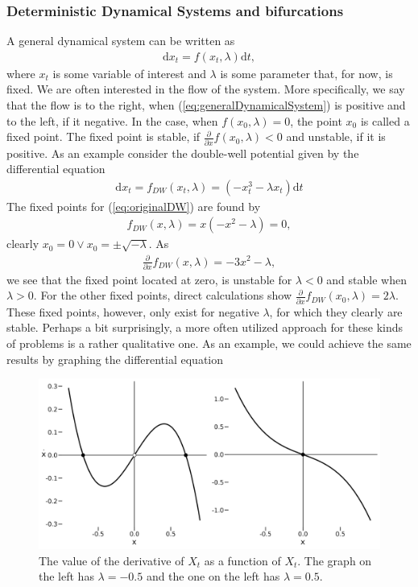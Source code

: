 \subsubsection{Deterministic Dynamical Systems and bifurcations}
A general dynamical system can be written as
\begin{align}
    \mathrm{d}x_t = f(x_t, \lambda)\mathrm{d}t, \label{eq:generalDynamicalSystem}
\end{align}
where $x_t$ is some variable of interest and $\lambda$ is some parameter that, for now, is fixed. We are often interested in the flow of the system. More specifically, we say that the flow is to the right, when (\ref{eq:generalDynamicalSystem}) is positive and to the left, if it negative. In the case, when $f(x_0, \lambda) = 0$, the point $x_0$ is called a fixed point. The fixed point is stable, if $\frac{\partial}{\partial x}f(x_0, \lambda) < 0$ and unstable, if it is positive. As an example consider the double-well potential given by the differential equation 
\begin{align}
    \mathrm{d}x_t = f_{DW}(x_t, \lambda) = \left(-x_t^3 - \lambda x_t\right) \mathrm{d}t \label{eq:originalDW}
\end{align}
The fixed points for (\ref{eq:originalDW}) are found by 
\begin{align}
    f_{DW}(x, \lambda) = x\left(-x^2 - \lambda\right) = 0,
\end{align}
clearly $x_0 = 0 \lor x_0 = \pm \sqrt{-\lambda}$. As 
\begin{align}
    \frac{\partial}{\partial x}f_{DW}(x, \lambda) = -3x^2 - \lambda,
\end{align}
we see that the fixed point located at zero, is unstable for $\lambda<0$ and stable when $\lambda>0$. For the other fixed points, direct calculations show $\frac{\partial}{\partial x}f_{DW}(x_0, \lambda) = 2\lambda$. These fixed points, however, only exist for negative $\lambda$, for which they clearly are stable. 
Perhaps a bit surprisingly, a more often utilized approach for these kinds of problems is a rather qualitative one. As an example, we could achieve the same results by graphing the differential equation
\begin{figure}[h]
    \begin{center}
        \includegraphics[scale = .125]{figures/double_well_plot_combined.jpeg}
        \caption{The value of the derivative of $X_t$ as a function of $X_t$.
        The graph on the left has $\lambda = -0.5$ and the one on the left has $\lambda = 0.5$.}
    \end{center}
\end{figure}\\
